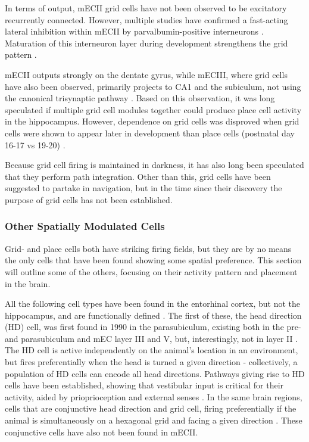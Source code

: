 \documentclass{article}
\begin{document}
    In terms of output, mECII grid cells have not been observed to be excitatory recurrently connected. However, multiple studies have confirmed a fast-acting lateral inhibition within mECII by parvalbumin-positive interneurons \parencite{Couey2013,Buetfering2014}. Maturation of this interneuron layer during development strengthens the grid pattern \parencite{Christensen2021}.

    mECII outputs strongly on the dentate gyrus, while mECIII, where grid cells have also been observed, primarily projects to CA1 and the subiculum, not using the canonical trisynaptic pathway \parencite{Tamamaki1993,Kerr2007,Witter2017}. Based on this observation, it was long speculated if multiple grid cell modules together could produce place cell activity in the hippocampus. However, dependence on grid cells  was disproved when grid cells were shown to appear later in development than place cells (postnatal day 16-17 vs 19-20) \parencite{Langston2010,Wills2010,Wills2012}.

    Because grid cell firing is maintained in darkness, it has also long been speculated that they perform path integration. Other than this, grid cells have been suggested to partake in navigation, but in the time since their discovery the purpose of grid cells has not been established.

    \subsubsection{Other Spatially Modulated Cells}
    Grid- and place cells both have striking firing fields, but they are by no means the only cells that have been found showing some spatial preference. This section will outline some of the others, focusing on their activity pattern and placement in the brain.
    
    All the following cell types have been found in the entorhinal cortex, but not the hippocampus, and are functionally defined \parencite{Brandon2014}. The first of these, the head direction (HD) cell, was first found in 1990 in the parasubiculum, existing both in the pre- and parasubiculum and mEC layer III and V, but, interestingly, not in layer II \parencite{Taube1990}. The HD cell is active independently on the animal's location in an environment, but fires preferentially when the head is turned a given direction - collectively, a population of HD cells can encode all head directions. Pathways giving rise to HD cells have been established, showing that vestibular input is critical for their activity, aided by prioprioception and external senses \parencite{Taube2007}. In the same brain regions, cells that are conjunctive head direction and grid cell, firing preferentially if the animal is simultaneously on a hexagonal grid and facing a given direction \parencite{Sargolini2006}. These conjunctive cells have also not been found in mECII.
\end{document}
